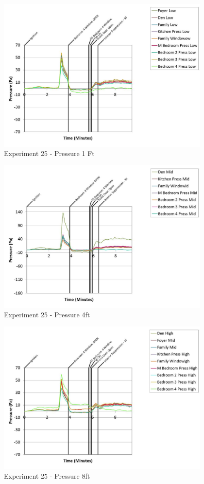 \documentclass{article}
\begin{document}
\begin{appendices}
	\clearpage

	\begin{figure}[h!]
		\centering
		\includegraphics[height=3.05in]{0_Images/Results_Charts/Exp_25_Charts/Pressure1Ft.pdf}
		\caption{Experiment 25 - Pressure 1 Ft}
	\end{figure}
 

	\begin{figure}[h!]
		\centering
		\includegraphics[height=3.05in]{0_Images/Results_Charts/Exp_25_Charts/Pressure4ft.pdf}
		\caption{Experiment 25 - Pressure 4ft}
	\end{figure}
 
	\clearpage

	\begin{figure}[h!]
		\centering
		\includegraphics[height=3.05in]{0_Images/Results_Charts/Exp_25_Charts/Pressure8ft.pdf}
		\caption{Experiment 25 - Pressure 8ft}
	\end{figure}
 


\end{appendices}
\end{document}
